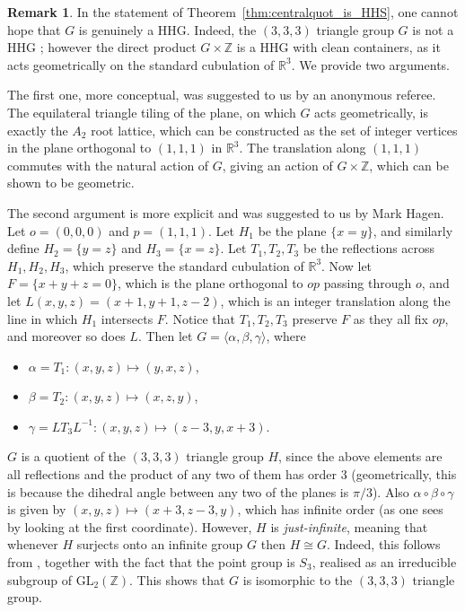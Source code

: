 \documentclass[svgnames]{amsart}
\theoremstyle{plain}
\theoremstyle{definition}
\newtheorem{rem}[thm]{Remark}
\newcommand{\Z}{\mathbb{Z}}
\newcommand{\R}{\mathbb{R}}
\begin{document}
\begin{rem}
\label{re-mark}
    In the statement of Theorem~\ref{thm:centralquot_is_HHS}, one cannot hope that $G$ is genuinely a HHG. Indeed, the $(3,3,3)$ triangle group $G$ is not a HHG \cite[Corollary 4.5]{PS_unbounded}; however the direct product $G\times \Z$ is a HHG with clean containers, as it acts geometrically on the standard cubulation of $\R^3$. We provide two arguments.
    
    The first one, more conceptual, was suggested to us by an anonymous referee. The equilateral triangle tiling of the plane, on which $G$ acts geometrically, is exactly the $A_2$ root lattice, which can be constructed as the set of integer vertices in the plane orthogonal to $(1,1,1)$ in $\R^3$. The translation along $(1,1,1)$ commutes with the natural action of $G$, giving an action of $G\times \Z$, which can be shown to be geometric.
      
    The second argument is more explicit and was suggested to us by Mark Hagen.  Let $o = (0,0,0)$ and $p = (1,1,1)$. Let $H_1$ be the plane $\{x=y\}$, and similarly define $H_2=\{y=z\}$ and $H_3=\{x=z\}$. Let $T_1, T_2, T_3$ be the reflections across $H_1, H_2, H_3$, which preserve the standard cubulation of $\R^3$. Now let $F=\{x+y+z=0\}$, which is the plane orthogonal to $op$ passing through $o$, and let $L(x,y,z)=(x+1,y+1,z-2)$, which is an integer translation along the line in which $H_1$ intersects $F$. Notice that $T_1,T_2,T_3$ preserve $F$ as they all fix $op$, and moreover so does $L$. Then let $G = \langle \alpha,\beta,\gamma\rangle$, where
    \begin{itemize}
    \item $\alpha=T_1\colon (x,y,z)\mapsto (y,x,z)$,
    \item $\beta=T_2\colon (x,y,z)\mapsto(x,z,y)$,
    \item $\gamma=LT_3L^{-1}\colon(x,y,z)\mapsto (z-3,y,x+3)$.
\end{itemize}
$G$ is a quotient of the $(3,3,3)$ triangle group $H$, since the above elements are all reflections and the product of any two of them has order $3$ (geometrically, this is because the dihedral angle between any two of the planes is $\pi/3$). Also $\alpha\circ\beta\circ\gamma$ is given by $(x, y, z) \mapsto (x+3, z-3, y)$, which has infinite order (as one sees by looking at the first coordinate). However, $H$ is \emph{just-infinite}, meaning that whenever $H$ surjects onto an infinite group $G$ then $H\cong G$. Indeed, this follows from \cite[Proposition 9]{McCarthy_just_infinite}, together with the fact that the point group is $S_3$, realised as an irreducible subgroup of $\mathrm{GL}_2(\mathbb{Z})$. This shows that $G$ is isomorphic to the $(3,3,3)$ triangle group.


\end{rem}
\end{document}
